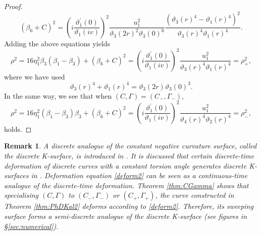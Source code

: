 \documentclass[10pt,leqno]{amsart}
\newtheorem{remark}[theorem]{Remark}
\numberwithin{equation}{section}
\begin{document}
\begin{proof}
\begin{equation}
\left(\beta_{6}+C\right)^{2}=\left(i\frac{\vartheta_{1}^{'}(0)}{\vartheta_{1}(iv)}\right)^{2}\frac{u_{1}^{2}}{\vartheta_{3}(2r)^{2}\vartheta_{3}(0)^{6}}\frac{\left(\vartheta_{3}(r)^{4}-\vartheta_{1}(r)^{4}\right)^{2}}{\vartheta_{3}(r)^{4}\vartheta_{1}(r)^{4}}.
\end{equation}
Adding the above equations yields
\begin{equation}\label{prf:prop12-3}
\rho^{2}=16\eta_{1}^{2}\beta_{3}\left(\beta_{1}-\beta_{3}\right)+\left(\beta_{6}+C\right)^{2}=\left(i\frac{\vartheta_{1}^{'}(0)}{\vartheta_{1}(iv)}\right)^{2}\frac{u_{1}^{2}}{\vartheta_{3}(r)^{4}\vartheta_{1}(r)^{4}}=\rho_{+}^{2},
\end{equation}
where we have used
\begin{equation}
    \vartheta_{3}(r)^{4}+\vartheta_{1}(r)^{4}=\vartheta_{3}(2r)\vartheta_{3}(0)^{3}.
\end{equation}
In the same way, we see that when $(C,\Gamma)=(C_-,\Gamma_-)$,
\begin{equation}\label{prf:prop12-6}
\rho^{2}=16\eta_{1}^{2}\left(\beta_{1}-\beta_{3}\right)\beta_{3}+\left(\beta_{6}+C\right)^{2}=\left(i\frac{\vartheta_{1}^{'}(0)}{\vartheta_{1}(iv)}\right)^{2}\frac{u_{1}^{2}}{\vartheta_{4}(r)^{4}\vartheta_{2}(r)^{4}}=\rho_{-}^{2},
\end{equation}
holds.
\end{proof}
\begin{remark}\label{rem:k-surface}
A discrete analogue of 
the constant negative curvature surface,
called the discrete K-surface, is introduced in \cite{bobenko1996discrete}.
It is discussed that certain discrete-time deformation of discrete curves with a constant torsion angle generates discrete K-surfaces in \cite{IKMO:DmKdVsG}.
Deformation equation \eqref{deform2} can be seen as a continuous-time analogue of the discrete-time deformation.
Theorem \ref{thm:CGamma} 
shows that specialising $(C,\Gamma)$ to $(C_-,\Gamma_-)$ or $(C_+,\Gamma_+)$, 
the curve constructed in Theorem \ref{thm:PhDKal2} deforms according to \eqref{deform2}.
Therefore, its sweeping surface forms a semi-discrete analogue of the discrete K-surface (see figures in \S \ref{sec:numerical}).
\end{remark}
\end{document}

